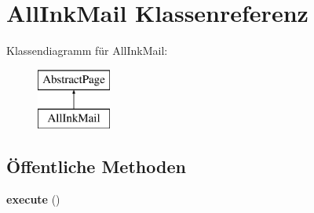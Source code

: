 \hypertarget{class_all_ink_mail}{}\section{All\+Ink\+Mail Klassenreferenz}
\label{class_all_ink_mail}
Klassendiagramm für All\+Ink\+Mail\+:\begin{figure}[H]
\begin{center}
\leavevmode
\includegraphics[height=2.000000cm]{class_all_ink_mail}
\end{center}
\end{figure}
\subsection*{Öffentliche Methoden}
\begin{DoxyCompactItemize}
\item 
\mbox{\label{class_all_ink_mail_ac14a0acf4fe4a234ec17bf5f2533ace5}} 
{\bfseries execute} ()
\end{DoxyCompactItemize}
